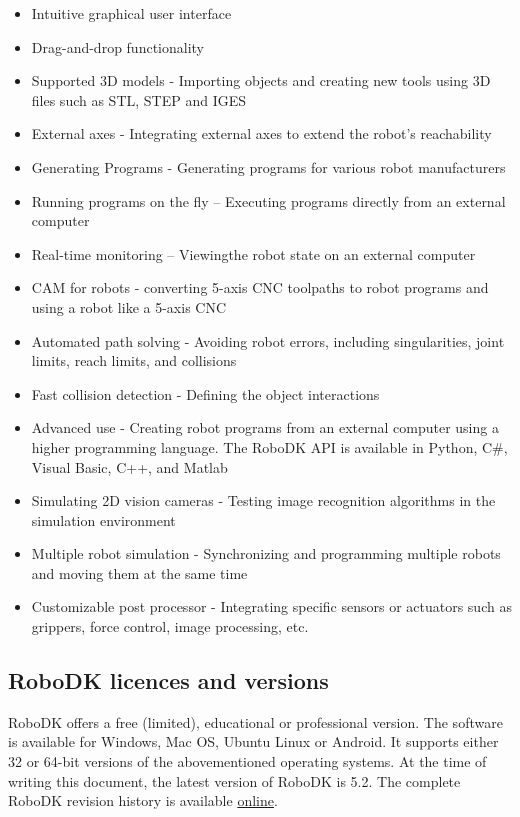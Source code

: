 \begin{itemize}
\item Intuitive graphical user interface
\item Drag-and-drop functionality 
\item Supported 3D models - Importing objects and creating new tools using 3D files such as STL, STEP and IGES
\item External axes - Integrating external axes to extend the robot’s reachability
\item Generating Programs - Generating programs for various robot manufacturers
\item Running programs on the fly – Executing programs directly from an external computer
\item Real-time monitoring – Viewingthe robot state on an external computer 
\item CAM for robots - converting 5-axis CNC toolpaths to robot programs and using a robot like a 5-axis CNC
\item Automated path solving - Avoiding robot errors, including singularities, joint limits, reach limits, and collisions
\item Fast collision detection - Defining the object interactions 
\item Advanced use - Creating robot programs from an external computer using a higher programming language. The RoboDK API is available in Python, C#, Visual Basic, C++, and Matlab
\item Simulating 2D vision cameras - Testing image recognition algorithms in the simulation environment
\item Multiple robot simulation - Synchronizing and programming multiple robots and moving them at the same time 
\item Customizable post processor - Integrating specific sensors or actuators such as grippers, force control, image processing, etc.
\end{itemize}

\subsection{RoboDK licences and versions}

RoboDK offers a free (limited), educational or professional version. 
The software is available for Windows, Mac OS, Ubuntu Linux or Android. It supports either 32 or 64-bit versions of the abovementioned operating systems. At the time of writing this document, the latest version of RoboDK is 5.2. The complete RoboDK revision history is available \href{https://en.etsmtl.ca/unites-de-recherche/coro/accueil?lang=en-CA}{online}. 

